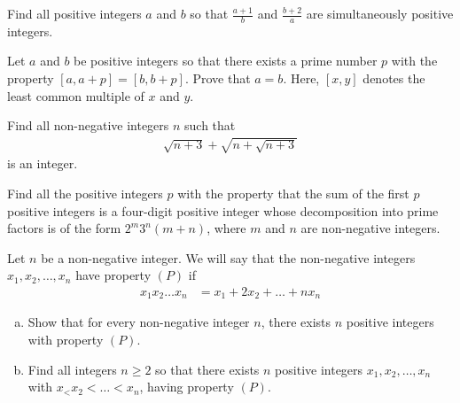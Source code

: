 \documentclass[problems.tex]{subfile}
\begin{document}
	\begin{problem}
		Find all positive integers $a$ and $b$ so that $\frac{a + 1}{b}$ and $\frac{b+2}{a}$ are simultaneously positive integers.
	\end{problem}

	\begin{problem}
		Let $a$ and $b$ be positive integers so that there exists a prime number $p$ with the property $[a, a + p] = [b, b + p]$. Prove that $a = b$. Here, $[x, y]$ denotes the least common multiple of $x$ and $y$.
	\end{problem}

	\begin{problem}
		Find all non-negative integers $n$ such that
		\begin{align*}
			\sqrt{n+3} + \sqrt{n+\sqrt{n+3}}
		\end{align*}
		is an integer.
	\end{problem}

	\begin{problem}
		Find all the positive integers $p$ with the property that the sum of the first $p$ positive integers is a four-digit positive integer whose decomposition into prime factors is of the form $2^m3^n(m + n)$, where $m$ and $n$ are non-negative integers.
	\end{problem}

	\begin{problem}
		Let $n$ be a non-negative integer. We will say that the non-negative integers $x_1, x_2, \dots, x_n$ have property $(P)$ if
			\begin{align*}
				x_1x_2 \dots x_n
					& = x_1 + 2x_2  + \dots + nx_n
			\end{align*}
		\begin{enumerate}[(a)]
			\item  Show that for every non-negative integer $n$, there exists $n$ positive integers with property $(P)$.
			\item Find all integers $n \geq 2$ so that there exists $n$ positive integers $x_1, x_2, \dots, x_n$	with $x_< x_2< \dots< x_n$, having property $(P)$.
		\end{enumerate}
	\end{problem}
\end{document}
